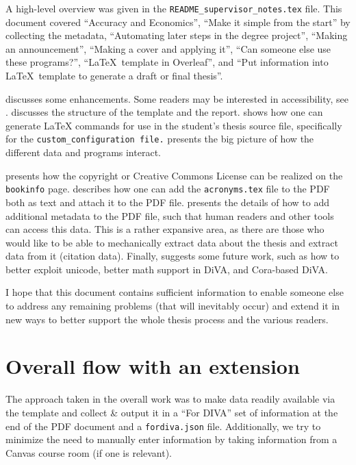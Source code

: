 \documentclass[12pt, twoside]{article}
\newcommand{\fname}[1]{\texttt{#1}}
\begin{document}
A high-level overview was given in the \fname{README\_supervisor\_notes.tex} file. This document covered \enquote{Accuracy and Economics}, \enquote{Make it simple from the start} by collecting the metadata, 
\enquote{Automating later steps in the degree project},
\enquote{Making an announcement},
\enquote{Making a cover and applying it},
\enquote{Can someone else use these programs?},
\enquote{\LaTeX{}~template in Overleaf}, and
\enquote{Put information into \LaTeX{}~template to generate a draft or final thesis}.

 discusses some enhancements. Some readers may be interested in accessibility, see .  discusses the structure of the template and the report. 
 shows how one can generate \LaTeX{}  commands for use in the student’s thesis source file, specifically for the \texttt{custom\_configuration file.}
 presents the big picture of how the different data and programs interact.

 presents how the copyright or Creative Commons License can be realized on the \texttt{bookinfo} page.
 describes how one can add the  \fname{acronyms.tex} file to the \gls{PDF} both as text and attach it to the \gls{PDF} file.
 presents the details of how to add additional metadata to the \gls{PDF} file, such that human readers and other tools can access this data. This is a rather expansive area, as there are those who would like to be able to mechanically extract data about the thesis and extract data from it (\eg citation data).
Finally,  suggests some future work, such as how to better exploit unicode, better math support in \gls{DiVA}, and Cora-based \gls{DiVA}.

I hope that this document contains sufficient information to enable someone else to address any remaining problems (that will inevitably occur) and extend it in new ways to better support the whole thesis process and the various readers.

\section{Overall flow with an extension}
The approach taken in the overall work was to make data readily available via the template and collect \& output it in a 
“For DIVA” set of information at the end of the \gls{PDF} document and a \fname{fordiva.json} file. Additionally, we try to minimize the need to manually enter information by taking information from a Canvas course room (if one is relevant).
\end{document}
